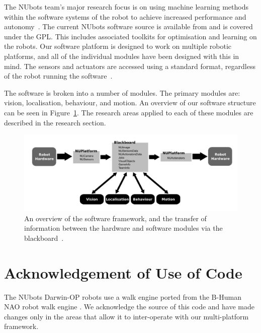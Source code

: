 \documentclass{llncs}
\begin{document}

The NUbots team's major research focus is on using machine learning methods within the software systems of the robot to achieve increased performance and autonomy~\cite{ChalupEtAlSMC2007}. The current NUbots software source is available from \cite{nubotsGit} and is covered under the GPL. This includes associated toolkits for optimisation and learning on the robots. Our software platform is designed to work on multiple robotic platforms, and all of the individual modules have been designed with this in mind. The sensors and actuators are accessed using a standard format, regardless of the robot running the software~\cite{Kulk2011c}. 

The software is broken into a number of modules. The primary modules are: vision, localisation, behaviour, and motion. An overview of our software structure can be seen in Figure~\ref{fig:platform}. The research areas applied to each of these modules are described in the research section.

\begin{figure}[bht!]
\begin{center}
\includegraphics[width=1.0\textwidth]{Platform.png}
\caption{An overview of the software framework, and the transfer of information between the hardware and software modules via the blackboard~\cite{Kulk2011c}.}
\label{fig:platform}
\end{center}
\end{figure}


\section{Acknowledgement of Use of Code}
The NUbots Darwin-OP robots use a walk engine ported from the B-Human NAO robot walk engine \cite{BHumanWalk2010}. We acknowledge the source of this code and have made changes only in the areas that allow it to inter-operate with our multi-platform framework.
\end{document}
